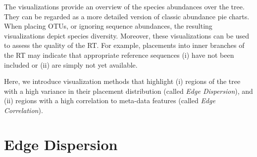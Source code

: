 The visualizations provide an overview of the species abundances over the tree.
They can be regarded as a more detailed version of classic abundance pie charts.
When placing OTUs, or ignoring sequence abundances, the resulting visualizations depict species diversity.
Moreover, these visualizations can be used to assess the quality of the \ac{RT}.
For example, placements into inner branches of the \ac{RT} may indicate that appropriate reference sequences
(i) have not been included or (ii) are simply not yet available.

Here, we introduce visualization methods that highlight
(i) regions of the tree with a high variance in their placement distribution (called \emph{Edge Dispersion}),
and (ii) regions with a high correlation to meta-data features (called \emph{Edge Correlation}).


\section{Edge Dispersion}
\label{ch:Visualization:sec:EdgeDispersion}

